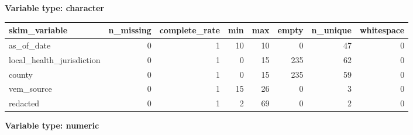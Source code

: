 \documentclass[
]{article}
\begin{document}
\textbf{Variable type: character}

\begin{longtable}[]{@{}lrrrrrrr@{}}
\toprule
skim\_variable & n\_missing & complete\_rate & min & max & empty &
n\_unique & whitespace \\
\midrule
\endhead
as\_of\_date & 0 & 1 & 10 & 10 & 0 & 47 & 0 \\
local\_health\_jurisdiction & 0 & 1 & 0 & 15 & 235 & 62 & 0 \\
county & 0 & 1 & 0 & 15 & 235 & 59 & 0 \\
vem\_source & 0 & 1 & 15 & 26 & 0 & 3 & 0 \\
redacted & 0 & 1 & 2 & 69 & 0 & 2 & 0 \\
\bottomrule
\end{longtable}

\textbf{Variable type: numeric}
\end{document}
